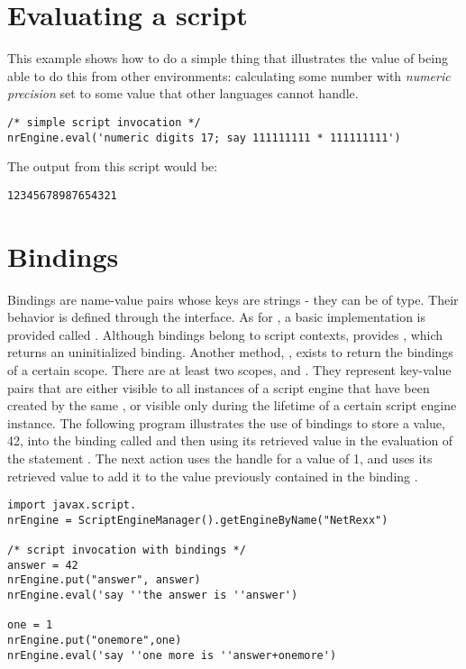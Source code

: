 \section{Evaluating a script}
This example shows how to do a simple thing that illustrates the value of being able to do this from other environments: calculating some number with \emph{numeric precision} set to some value that other languages cannot handle.
\begin{lstlisting}[label=evaljsr223,caption=Evaluating a script]
/* simple script invocation */
nrEngine.eval('numeric digits 17; say 111111111 * 111111111')
\end{lstlisting}
The output from this script would be:
\begin{alltt}
12345678987654321
\end{alltt}
\section{Bindings}
Bindings are name-value pairs whose keys are strings - they can be of \Rexx{} type. Their behavior is defined through the  interface. As for , a basic implementation is provided called . Although bindings belong to script contexts,  provides , which returns an uninitialized binding. Another method, , exists to return the bindings of a certain scope. There are at least two scopes,  and . They represent key-value pairs that are either visible to all instances of a script engine that have been created by the same , or visible only during the lifetime of a certain script engine instance. The following program illustrates the use of bindings to store a value, 42, into the binding called  and then using its retrieved value in the evaluation of the statement . The next action uses the handle  for a value of 1, and uses its retrieved value to add it to the value previously contained in the binding .
\begin{lstlisting}[label=bindingsjsr223,caption=Object Bindings]
import javax.script.
nrEngine = ScriptEngineManager().getEngineByName("NetRexx")

/* script invocation with bindings */
answer = 42
nrEngine.put("answer", answer)
nrEngine.eval('say ''the answer is ''answer')

one = 1
nrEngine.put("onemore",one)
nrEngine.eval('say ''one more is ''answer+onemore')
\end{lstlisting}
